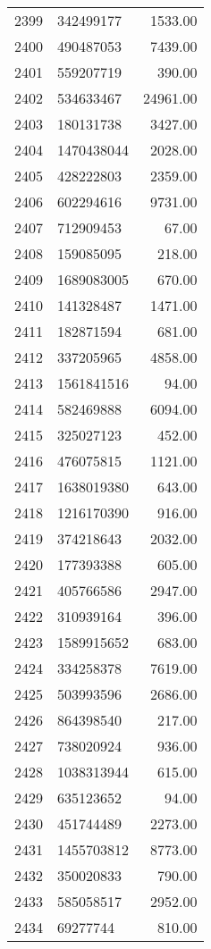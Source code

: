 \begin{table}[ht]
\begin{tabular}{rlr}
  2399 & 342499177 & 1533.00 \\ 
  2400 & 490487053 & 7439.00 \\ 
  2401 & 559207719 & 390.00 \\ 
  2402 & 534633467 & 24961.00 \\ 
  2403 & 180131738 & 3427.00 \\ 
  2404 & 1470438044 & 2028.00 \\ 
  2405 & 428222803 & 2359.00 \\ 
  2406 & 602294616 & 9731.00 \\ 
  2407 & 712909453 & 67.00 \\ 
  2408 & 159085095 & 218.00 \\ 
  2409 & 1689083005 & 670.00 \\ 
  2410 & 141328487 & 1471.00 \\ 
  2411 & 182871594 & 681.00 \\ 
  2412 & 337205965 & 4858.00 \\ 
  2413 & 1561841516 & 94.00 \\ 
  2414 & 582469888 & 6094.00 \\ 
  2415 & 325027123 & 452.00 \\ 
  2416 & 476075815 & 1121.00 \\ 
  2417 & 1638019380 & 643.00 \\ 
  2418 & 1216170390 & 916.00 \\ 
  2419 & 374218643 & 2032.00 \\ 
  2420 & 177393388 & 605.00 \\ 
  2421 & 405766586 & 2947.00 \\ 
  2422 & 310939164 & 396.00 \\ 
  2423 & 1589915652 & 683.00 \\ 
  2424 & 334258378 & 7619.00 \\ 
  2425 & 503993596 & 2686.00 \\ 
  2426 & 864398540 & 217.00 \\ 
  2427 & 738020924 & 936.00 \\ 
  2428 & 1038313944 & 615.00 \\ 
  2429 & 635123652 & 94.00 \\ 
  2430 & 451744489 & 2273.00 \\ 
  2431 & 1455703812 & 8773.00 \\ 
  2432 & 350020833 & 790.00 \\ 
  2433 & 585058517 & 2952.00 \\ 
  2434 & 69277744 & 810.00 \\ 

\end{tabular}
\end{table}
